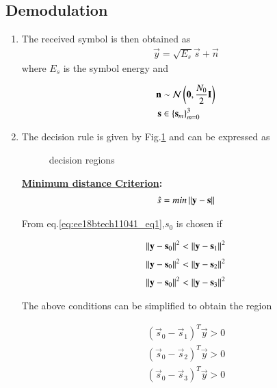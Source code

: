 \subsection{Demodulation}
\begin{enumerate}[label=\thesubsection.\arabic*.,ref=\thesubsection.\theenumi]
\item The received symbol is then obtained as
\begin{align}
\vec{y} = \sqrt{E_s}\vec{s} + \vec{n}
\end{align}
%
where $E_s$ is the symbol energy and 

\begin{align}
\mathbf{n} &\sim \mathcal{N}\left(\mathbf{0},\frac{N_0}{2}\mathbf{I}\right)
\\
\mathbf{s} &\in \left\{\mathbf{s}_m\right\}_{m = 0}^{3}
\end{align}
\item The decision rule is given by Fig.\ref{fig:ee18btech11041_fig2} and can be expressed as

\begin{figure}[!ht]
                \resizebox{\columnwidth}{!}{}


\caption{decision regions}
\label{fig:ee18btech11041_fig2}	
\end{figure}

\textbf{\underline{Minimum distance Criterion}:}
\begin{align}
    \hat{s} = min \left\lVert\textbf{y} - \textbf{s}\right\rVert
    \label{eq:ee18btech11041_eq1}
\end{align}

From eq.\ref{eq:ee18btech11041_eq1},\textbf{$s_{0}$} is chosen if

\begin{align}
    \left\lVert\mathbf{y}-\mathbf{s}_0\right\rVert^2 < \left\lVert\mathbf{y}-\mathbf{s}_1\right\rVert^2
\end{align}
\begin{align}
    \left\lVert\mathbf{y}-\mathbf{s}_0\right\rVert^2 < \left\lVert\mathbf{y}-\mathbf{s}_2\right\rVert^2
\end{align}
\begin{align}
    \left\lVert\mathbf{y}-\mathbf{s}_0\right\rVert^2 < \left\lVert\mathbf{y}-\mathbf{s}_3\right\rVert^2
\end{align}

The above conditions can be simplified to obtain the region


\begin{align}
    (\vec{s}_0-\vec{s}_1)^T\vec{y}>0
\end{align}
\begin{align}
    (\vec{s}_0-\vec{s}_2)^T\vec{y}>0
\end{align}
\begin{align}
    (\vec{s}_0-\vec{s}_3)^T\vec{y}>0
\end{align}


\end{enumerate}
